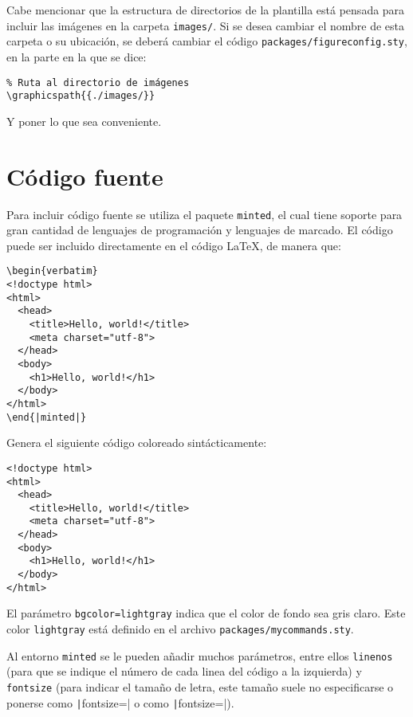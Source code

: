 \documentclass[../main.tex]{subfile}
\begin{document}

    Cabe mencionar que la estructura de directorios de la plantilla está pensada para incluir las imágenes en la carpeta \texttt{images/}. Si se desea cambiar el nombre de esta carpeta o su ubicación, se deberá cambiar el código \texttt{packages/figureconfig.sty}, en la parte en la que se dice:

    \begin{verbatim}
% Ruta al directorio de imágenes
\graphicspath{{./images/}}
    \end{verbatim}

    Y poner lo que sea conveniente.

  \section{Código fuente}

    Para incluir código fuente se utiliza el paquete \texttt{minted}, el cual tiene soporte para gran cantidad de lenguajes de programación y lenguajes de marcado. El código puede ser incluido directamente en el código LaTeX, de manera que:

    \begin{verbatim}
\begin{verbatim}
<!doctype html>
<html>
  <head>
    <title>Hello, world!</title>
    <meta charset="utf-8">
  </head>
  <body>
    <h1>Hello, world!</h1>
  </body>
</html>
\end{|minted|}
    \end{verbatim}

    Genera el siguiente código coloreado sintácticamente:

    \begin{verbatim}
<!doctype html>
<html>
  <head>
    <title>Hello, world!</title>
    <meta charset="utf-8">
  </head>
  <body>
    <h1>Hello, world!</h1>
  </body>
</html>
    \end{verbatim}

    El parámetro \texttt{bgcolor=lightgray} indica que el color de fondo sea gris claro. Este color \texttt{lightgray} está definido en el archivo \texttt{packages/mycommands.sty}.

    Al entorno \texttt{minted} se le pueden añadir muchos parámetros, entre ellos \texttt{linenos} (para que se indique el número de cada linea del código a la izquierda) y \texttt{fontsize} (para indicar el tamaño de letra, este tamaño suele no especificarse o ponerse como \texttt|fontsize=\footnotesize| o como \texttt|fontsize=\scriptsize|).
\end{document}
